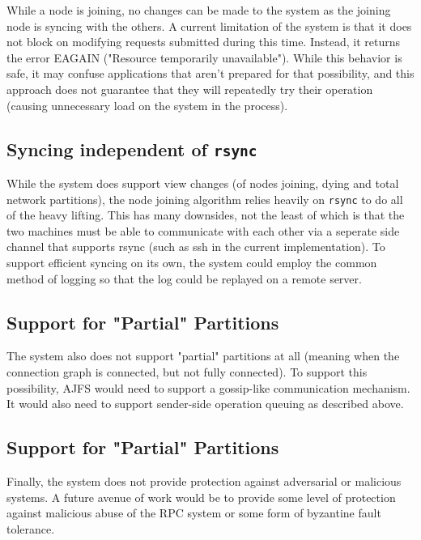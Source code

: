 While a node is joining, no changes can be made to the system as the joining
node is syncing with the others. A current limitation of the system is that it
does not block on modifying requests submitted during this time. Instead, it
returns the error EAGAIN ("Resource temporarily unavailable"). While this
behavior is safe, it may confuse applications that aren't prepared for that
possibility, and this approach does not guarantee that they will repeatedly try
their operation (causing unnecessary load on the system in the process).

\subsection{Syncing independent of \texttt{rsync}}

While the system does support view changes (of nodes joining, dying and total
network partitions), the node joining algorithm relies heavily on \texttt{rsync}
to do all of the heavy lifting. This has many downsides, not the least of which
is that the two machines must be able to communicate with each other via a
seperate side channel that supports rsync (such as ssh in the current
implementation). To support efficient syncing on its own, the system could
employ the common method of logging so that the log could be replayed on a
remote server.

\subsection{Support for "Partial" Partitions}

The system also does not support "partial" partitions at all (meaning when
the connection graph is connected, but not fully connected). To support this
possibility, AJFS would need to support a gossip-like communication mechanism.
It would also need to support sender-side operation queuing as described above.

\subsection{Support for "Partial" Partitions}

Finally, the system does not provide protection against adversarial or malicious
systems. A future avenue of work would be to provide some level of protection
against malicious abuse of the RPC system or some form of byzantine fault
tolerance.
